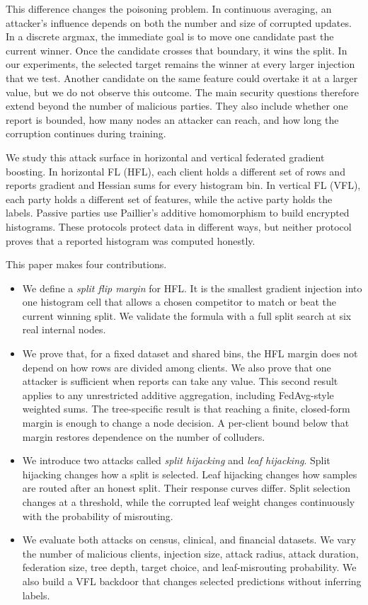\documentclass[11pt]{article}
\begin{document}
This difference changes the poisoning problem. In continuous averaging, an attacker's influence depends on both the number and size of corrupted updates. In a discrete argmax, the immediate goal is to move one candidate past the current winner. Once the candidate crosses that boundary, it wins the split. In our experiments, the selected target remains the winner at every larger injection that we test. Another candidate on the same feature could overtake it at a larger value, but we do not observe this outcome. The main security questions therefore extend beyond the number of malicious parties. They also include whether one report is bounded, how many nodes an attacker can reach, and how long the corruption continues during training.

We study this attack surface in horizontal and vertical federated gradient boosting. In horizontal FL (HFL), each client holds a different set of rows and reports gradient and Hessian sums for every histogram bin. In vertical FL (VFL), each party holds a different set of features, while the active party holds the labels. Passive parties use Paillier's additive homomorphism to build encrypted histograms. These protocols protect data in different ways, but neither protocol proves that a reported histogram was computed honestly.

This paper makes four contributions.

\begin{itemize}
  \item We define a \emph{split flip margin} for HFL. It is the smallest gradient injection into one histogram cell that allows a chosen competitor to match or beat the current winning split. We validate the formula with a full split search at six real internal nodes.

  \item We prove that, for a fixed dataset and shared bins, the HFL margin does not depend on how rows are divided among clients. We also prove that one attacker is sufficient when reports can take any value. This second result applies to any unrestricted additive aggregation, including FedAvg-style weighted sums. The tree-specific result is that reaching a finite, closed-form margin is enough to change a node decision. A per-client bound below that margin restores dependence on the number of colluders.

  \item We introduce two attacks called \emph{split hijacking} and \emph{leaf hijacking}. Split hijacking changes how a split is selected. Leaf hijacking changes how samples are routed after an honest split. Their response curves differ. Split selection changes at a threshold, while the corrupted leaf weight changes continuously with the probability of misrouting.

  \item We evaluate both attacks on census, clinical, and financial datasets. We vary the number of malicious clients, injection size, attack radius, attack duration, federation size, tree depth, target choice, and leaf-misrouting probability. We also build a VFL backdoor that changes selected predictions without inferring labels.
\end{itemize}
\end{document}
